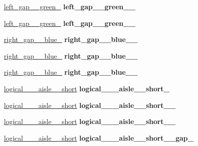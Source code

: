 \begin{DoxyCompactItemize}
\hyperlink{structPresetLocation}{left\+\_\+gap\+\_\+\_\+green\+\_} {\bfseries left\+\_\+gap\+\_\+\_\+green\+\_\+\_\+}
\item 
\mbox{\label{classGantryControl_a276a42fea03dd4a23fe5c522205ede5e}} 
\hyperlink{structPresetLocation}{left\+\_\+gap\+\_\+\_\+green\+\_} {\bfseries left\+\_\+gap\+\_\+\_\+green\+\_\+\_\+}
\item 
\mbox{\label{classGantryControl_a677fd9d84c4c967f33eedd2c79711ff3}} 
\hyperlink{structPresetLocation}{right\+\_\+gap\+\_\+\_\+blue\+\_} {\bfseries right\+\_\+gap\+\_\+\_\+blue\+\_\+\_\+}
\item 
\mbox{\label{classGantryControl_a995db199bb9ad2e98b743bc9cc5b5d6e}} 
\hyperlink{structPresetLocation}{right\+\_\+gap\+\_\+\_\+blue\+\_} {\bfseries right\+\_\+gap\+\_\+\_\+blue\+\_\+\_\+}
\item 
\mbox{\label{classGantryControl_a181e7d8c1c8faa6c03e4d9f8f2237733}} 
\hyperlink{structPresetLocation}{right\+\_\+gap\+\_\+\_\+blue\+\_} {\bfseries right\+\_\+gap\+\_\+\_\+blue\+\_\+\_\+}
\item 
\mbox{\label{classGantryControl_a5fd16e2db3b90e6739fe9526b0f7d2d9}} 
\hyperlink{structPresetLocation}{logical\+\_\+\_\+\_\+aisle\+\_\+\_\+short} {\bfseries logical\+\_\+\_\+\_\+aisle\+\_\+\_\+short\+\_\+}
\item 
\mbox{\label{classGantryControl_ac60742d72ba146f6f00a25fafc69d53b}} 
\hyperlink{structPresetLocation}{logical\+\_\+\_\+\_\+aisle\+\_\+\_\+short} {\bfseries logical\+\_\+\_\+\_\+aisle\+\_\+\_\+short\+\_\+\_\+}
\item 
\mbox{\label{classGantryControl_a937d903c26d17f3a4cfc1d9c895a5ecd}} 
\hyperlink{structPresetLocation}{logical\+\_\+\_\+\_\+aisle\+\_\+\_\+short} {\bfseries logical\+\_\+\_\+\_\+aisle\+\_\+\_\+short\+\_\+\_\+}
\item 
\mbox{\label{classGantryControl_ab6feb334f7757184481cb4456343a1ce}} 
\hyperlink{structPresetLocation}{logical\+\_\+\_\+\_\+aisle\+\_\+\_\+short} {\bfseries logical\+\_\+\_\+\_\+aisle\+\_\+\_\+short\+\_\+\_\+gap\+\_\+}

\end{DoxyCompactItemize}
